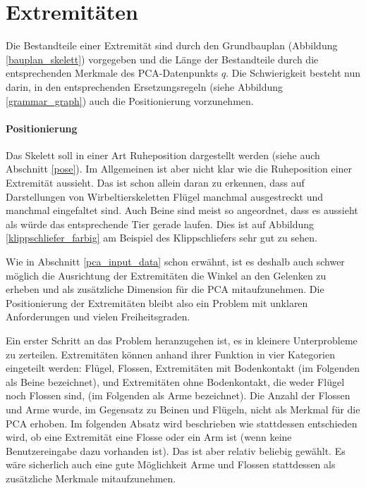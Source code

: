 \newpage
\section{Extremitäten}
\label{section:extremity_generation}

Die Bestandteile einer Extremität sind durch den Grundbauplan (Abbildung \ref{bauplan_skelett}) vorgegeben und die Länge der Bestandteile durch die entsprechenden Merkmale des PCA-Datenpunkts $q$. Die Schwierigkeit besteht nun darin, in den entsprechenden Ersetzungsregeln (siehe Abbildung \ref{grammar_graph}) auch die Positionierung vorzunehmen.

\paragraph{Positionierung}
Das Skelett soll in einer Art Ruheposition dargestellt werden (siehe auch Abschnitt \ref{pose}). Im Allgemeinen ist aber nicht klar wie die Ruheposition einer Extremität aussieht. Das ist schon allein daran zu erkennen, dass auf Darstellungen von Wirbeltierskeletten Flügel manchmal ausgestreckt und manchmal eingefaltet sind. Auch Beine sind meist so angeordnet, dass es aussieht als würde das entsprechende Tier gerade laufen. Dies ist auf Abbildung \ref{klippschliefer_farbig} am Beispiel des Klippschliefers sehr gut zu sehen.

Wie in Abschnitt \ref{pca_input_data} schon erwähnt, ist es deshalb auch schwer möglich die Ausrichtung der Extremitäten \bzw die Winkel an den Gelenken zu erheben und als zusätzliche Dimension für die PCA mitaufzunehmen.
Die Positionierung der Extremitäten bleibt also ein Problem mit unklaren Anforderungen und vielen Freiheitsgraden.

Ein erster Schritt an das Problem heranzugehen ist, es in kleinere Unterprobleme zu zerteilen.
Extremitäten können anhand ihrer Funktion in vier Kategorien eingeteilt werden:
Flügel, Flossen, Extremitäten mit Bodenkontakt (im Folgenden als Beine bezeichnet), und Extremitäten ohne Bodenkontakt, die weder Flügel noch Flossen sind, (im Folgenden als Arme bezeichnet). Die Anzahl der Flossen und Arme wurde, im Gegensatz zu Beinen und Flügeln, nicht als Merkmal für die PCA erhoben. Im folgenden Absatz wird beschrieben wie stattdessen entschieden wird, ob eine Extremität eine Flosse oder ein Arm ist (wenn keine Benutzereingabe dazu vorhanden ist). Das ist aber relativ beliebig gewählt. Es wäre sicherlich auch eine gute Möglichkeit Arme und Flossen stattdessen als zusätzliche Merkmale mitaufzunehmen.

